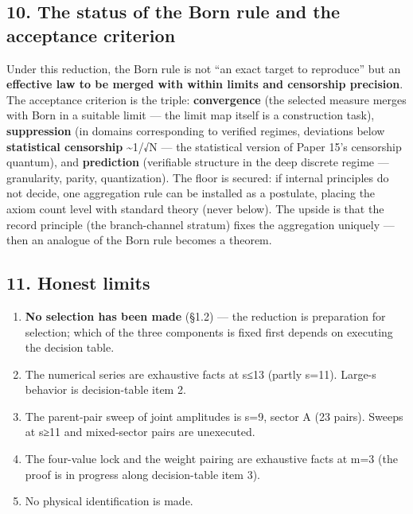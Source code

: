 \documentclass[
]{ltjsarticle}
\providecommand{\tightlist}{%
  \setlength{\itemsep}{0pt}\setlength{\parskip}{0pt}}
\begin{document}
\subsection{10. The status of the Born rule and the acceptance
criterion}\label{the-status-of-the-born-rule-and-the-acceptance-criterion}

Under this reduction, the Born rule is not ``an exact target to
reproduce'' but an \textbf{effective law to be merged with within limits
and censorship precision}. The acceptance criterion is the triple:
\textbf{convergence} (the selected measure merges with Born in a
suitable limit --- the limit map itself is a construction task),
\textbf{suppression} (in domains corresponding to verified regimes,
deviations below \textbf{statistical censorship} \textasciitilde1/√N ---
the statistical version of Paper 15's censorship quantum), and
\textbf{prediction} (verifiable structure in the deep discrete regime
--- granularity, parity, quantization). The floor is secured: if
internal principles do not decide, one aggregation rule can be installed
as a postulate, placing the axiom count level with standard theory
(never below). The upside is that the record principle (the
branch-channel stratum) fixes the aggregation uniquely --- then an
analogue of the Born rule becomes a theorem.

\subsection{11. Honest limits}\label{honest-limits}

\begin{enumerate}
\def\labelenumi{\arabic{enumi}.}
\tightlist
\item
  \textbf{No selection has been made} (§1.2) --- the reduction is
  preparation for selection; which of the three components is fixed
  first depends on executing the decision table.
\item
  The numerical series are exhaustive facts at s≤13 (partly s=11).
  Large-s behavior is decision-table item 2.
\item
  The parent-pair sweep of joint amplitudes is s=9, sector A (23 pairs).
  Sweeps at s≥11 and mixed-sector pairs are unexecuted.
\item
  The four-value lock and the weight pairing are exhaustive facts at m=3
  (the proof is in progress along decision-table item 3).
\item
  No physical identification is made.
\end{enumerate}
\end{document}
